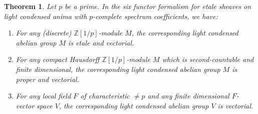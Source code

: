 \documentclass[12pt]{article}
\newtheorem{theorem}{Theorem}[section]
\newcommand{\mbb}{\mathbb}
\begin{document}
\begin{theorem}\label{lotsofvectorial}
Let $p$ be a prime. In the six functor formalism for etale sheaves on light condensed anima with $p$-complete spectrum coefficients, we have:
\begin{enumerate}
\item For any (discrete) $\mbb{Z}[1/p]$-module $M$, the corresponding light condensed abelian group $M$ is etale and vectorial.
\item For any compact Hausdorff $\mbb{Z}[1/p]$-module $M$ which is second-countable and finite dimensional, the corresponding light condensed abelian group $M$ is proper and vectorial.
\item For any local field $F$ of characteristic $\neq p$ and any finite dimensional $F$-vector space $V$, the corresponding light condensed abelian group $V$ is vectorial.
\end{enumerate}
\end{theorem}
\end{document}
